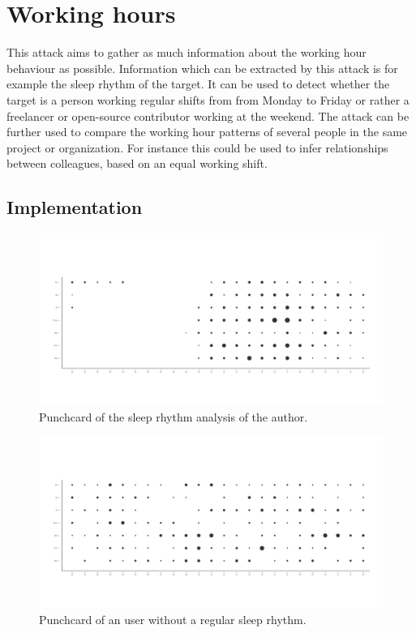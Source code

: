 \section{Working hours}

This attack aims to gather as much information about the working hour behaviour as possible.
Information which can be extracted by this attack is for example the sleep rhythm of the target.
It can be used to detect whether the target is a person working regular shifts from from Monday to Friday or rather a freelancer or open-source contributor working at the weekend.
The attack can be further used to compare the working hour patterns of several people in the same project or organization.
For instance this could be used to infer relationships between colleagues, based on an equal working shift.

\subsection{Implementation}

\begin{figure}[H]
    \includegraphics[scale=0.20]{./graphs/analysis/ordered-punchcard}
    \centering
    \caption{Punchcard of the sleep rhythm analysis of the author.}\label{fig:working-hour-rhythm-author}
\end{figure}

\begin{figure}[H]
    \includegraphics[scale=0.20]{./graphs/analysis/random-punchcard}
    \centering
    \caption{Punchcard of an user without a regular sleep rhythm.}\label{fig:random-sleep-rhythm}
\end{figure}

